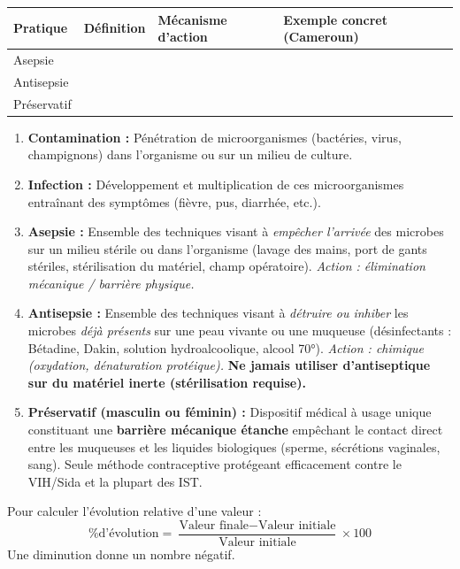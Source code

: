 \documentclass[11pt]{article}
\newcounter{popsec}
\newcounter{popsub}
\newcommand{\courssub}[1]{%
  \stepcounter{popsub}%
  \par\vspace{9pt}\noindent{\popxbold\fontsize{11.5}{13}\selectfont\color{popink}{\color{poporange}\thepopsec.\thepopsub}\hspace{6pt}#1}\par\nopagebreak\vspace{4pt}
}
\begin{document}
\begin{center}
\begin{tabularx}{\linewidth}{|l|X|X|X|}\hline
\rowcolor{popblueL}
\textbf{Pratique} & \textbf{Définition} & \textbf{Mécanisme d'action} & \textbf{Exemple concret (Cameroun)} \\ \hline
Asepsie & & & \\ \hline
Antisepsie & & & \\ \hline
Préservatif & & & \\ \hline
\end{tabularx}
\end{center}

\courssub{Ressources à mobiliser}

\begin{aretenir}
\begin{enumerate}
\item \textbf{Contamination :} Pénétration de microorganismes (bactéries, virus, champignons) dans l'organisme ou sur un milieu de culture.
\item \textbf{Infection :} Développement et multiplication de ces microorganismes entraînant des symptômes (fièvre, pus, diarrhée, etc.).
\item \textbf{Asepsie :} Ensemble des techniques visant à \emph{empêcher l'arrivée} des microbes sur un milieu stérile ou dans l'organisme (lavage des mains, port de gants stériles, stérilisation du matériel, champ opératoire). \emph{Action : élimination mécanique / barrière physique.}
\item \textbf{Antisepsie :} Ensemble des techniques visant à \emph{détruire ou inhiber} les microbes \emph{déjà présents} sur une peau vivante ou une muqueuse (désinfectants : Bétadine\textregistered, Dakin\textregistered, solution hydroalcoolique, alcool 70°). \emph{Action : chimique (oxydation, dénaturation protéique).} \textbf{Ne jamais utiliser d'antiseptique sur du matériel inerte (stérilisation requise).}
\item \textbf{Préservatif (masculin ou féminin) :} Dispositif médical à usage unique constituant une \textbf{barrière mécanique étanche} empêchant le contact direct entre les muqueuses et les liquides biologiques (sperme, sécrétions vaginales, sang). Seule méthode contraceptive protégeant efficacement contre le VIH/Sida et la plupart des IST.
\end{enumerate}
\end{aretenir}

\begin{methode}
Pour calculer l'évolution relative d'une valeur :
\[
\text{\% d'évolution} = \frac{\text{Valeur finale} - \text{Valeur initiale}}{\text{Valeur initiale}} \times 100
\]
Une diminution donne un nombre négatif.
\end{methode}
\end{document}
